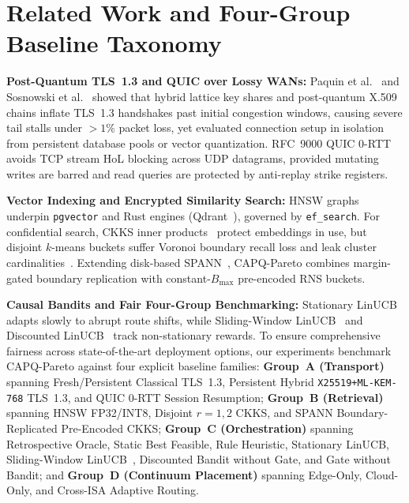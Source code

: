 \documentclass[10pt,journal,compsoc]{IEEEtran}
\begin{document}
\section{Related Work and Four-Group Baseline Taxonomy}\label{sec:related}
\textbf{Post-Quantum TLS~1.3 and QUIC over Lossy WANs:} Paquin et al.~\cite{paquin2020pqctls} and Sosnowski et al.~\cite{sosnowski2023pqckem} showed that hybrid lattice key shares and post-quantum X.509 chains inflate TLS~1.3 handshakes past initial congestion windows, causing severe tail stalls under $>1\%$ packet loss, yet evaluated connection setup in isolation from persistent database pools or vector quantization. RFC~9000 QUIC 0-RTT~\cite{rfc9000_quic} avoids TCP stream HoL blocking across UDP datagrams, provided mutating writes are barred and read queries are protected by anti-replay strike registers.

\textbf{Vector Indexing and Encrypted Similarity Search:} HNSW graphs~\cite{malkov2020hnsw} underpin \texttt{pgvector} and Rust engines (Qdrant~\cite{pan2024vectordbsurvey}), governed by \texttt{ef\_search}. For confidential search, CKKS inner products~\cite{cheon2017ckks,boemer2021hexl} protect embeddings in use, but disjoint $k$-means buckets suffer Voronoi boundary recall loss and leak cluster cardinalities~\cite{cash2015leakage,islam2012accesspattern}. Extending disk-based SPANN~\cite{chen2021spann}, CAPQ-Pareto combines margin-gated boundary replication with constant-$B_{\max}$ pre-encoded RNS buckets.

\textbf{Causal Bandits and Fair Four-Group Benchmarking:} Stationary LinUCB~\cite{li2010linucb} adapts slowly to abrupt route shifts, while Sliding-Window LinUCB~\cite{garivier2011swucb,cheung2019swlinucb} and Discounted LinUCB~\cite{russac2019dlinucb} track non-stationary rewards. To ensure comprehensive fairness across state-of-the-art deployment options, our experiments benchmark CAPQ-Pareto against four explicit baseline families: \textbf{Group~A (Transport)} spanning Fresh/Persistent Classical TLS~1.3, Persistent Hybrid \texttt{X25519+ML-KEM-768} TLS~1.3, and QUIC 0-RTT Session Resumption; \textbf{Group~B (Retrieval)} spanning HNSW FP32/INT8, Disjoint $r=1,2$ CKKS, and SPANN Boundary-Replicated Pre-Encoded CKKS; \textbf{Group~C (Orchestration)} spanning Retrospective Oracle, Static Best Feasible, Rule Heuristic, Stationary LinUCB, Sliding-Window LinUCB~\cite{cheung2019swlinucb}, Discounted Bandit without Gate, and Gate without Bandit; and \textbf{Group~D (Continuum Placement)} spanning Edge-Only, Cloud-Only, and Cross-ISA Adaptive Routing.
\end{document}
